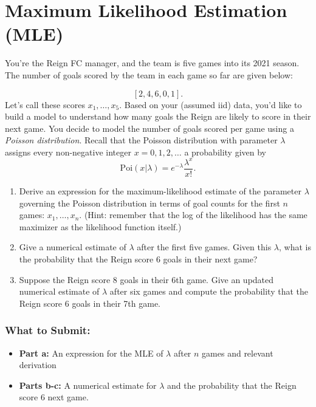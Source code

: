 \documentclass{article}
\begin{document}
\section*{Maximum Likelihood Estimation (MLE)}

\begin{aprob}
    You're the Reign FC manager, and the team is five games into its 2021 season. The number of goals scored by the team in each game so far are given below:
    
    \[
      [2, 4, 6, 0, 1].
    \]
    Let's call these scores $x_1, \dots, x_5$. Based on your (assumed iid) data, you'd like to build a model to understand how many goals the Reign are likely to score in their next game. You decide to model the number of goals scored per game using a \emph{Poisson distribution}. Recall that the Poisson distribution with parameter $\lambda$ assigns every non-negative integer $x = 0, 1, 2, \dots$ a probability given by
    \[
      \mathrm{Poi}(x | \lambda) = e^{-\lambda} \frac{\lambda ^ x}{x!}.
    \]
    
    \begin{enumerate}
        \item {} Derive an expression for the maximum-likelihood estimate of the parameter $\lambda$ governing the Poisson distribution in terms of goal counts for the first $n$ games: $x_1, \dots, x_n$. (Hint: remember that the log of the likelihood has the same maximizer as the likelihood function itself.)
        \item {} Give a numerical estimate of $\lambda$ after the first five games. Given this $\lambda$, what is the probability that the Reign score $6$ goals in their next game?
        \item {} Suppose the Reign score 8 goals in their 6th game. Give an updated numerical estimate of $\lambda$ after six games and compute the probability that the Reign score $6$ goals in their 7th game.
    \end{enumerate}
    \subsubsection*{What to Submit:}
    \begin{itemize}
        \item \textbf{Part a:} An expression for the MLE of $\lambda$ after $n$ games and relevant derivation
        \item \textbf{Parts b-c:} A numerical estimate for $\lambda$ and the probability that the Reign score 6 next game.
    \end{itemize}
\end{aprob}
\end{document}
